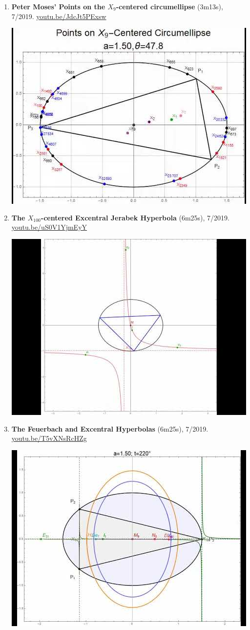 \documentclass[12pt]{article}
\begin{document}
\begin{enumerate}[resume]
% 
\item \textbf{Peter Moses' Points on the $X_{9}$-centered circumellipse} (3m13s), 7/2019. \href{https://youtu.be/JdcJt5PExsw}{\url{youtu.be/JdcJt5PExsw}}
\begin{center}\includegraphics[width=.5\textwidth]{pics/JdcJt5PExsw.jpg}\end{center}
% 
\item \textbf{The $X_{100}$-centered Excentral Jerabek Hyperbola} (6m25s), 7/2019. \href{https://youtu.be/uS0V1YjmEyY}{\url{youtu.be/uS0V1YjmEyY}}
\begin{center}\includegraphics[width=.5\textwidth]{pics/uS0V1YjmEyY.jpg}\end{center}
% 
\item \textbf{The Feuerbach and Excentral Hyperbolas} (6m25s), 7/2019. \href{https://youtu.be/T5vXNsRcHZg}{\url{youtu.be/T5vXNsRcHZg}}
\begin{center}\includegraphics[width=.5\textwidth]{pics/T5vXNsRcHZg.jpg}\end{center}

\end{enumerate}
\end{document}

